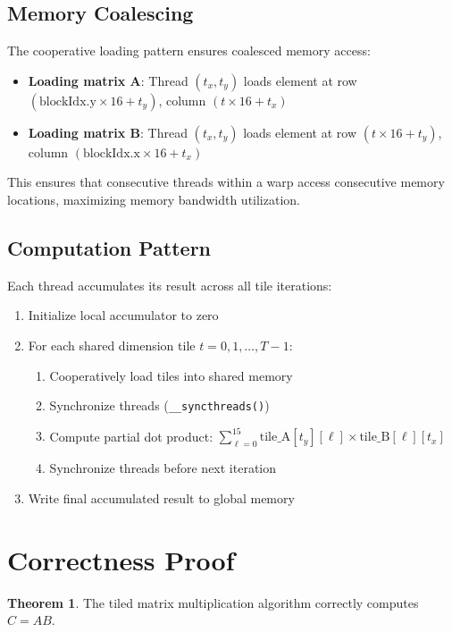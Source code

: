 \documentclass{amsbook}
\theoremstyle{definition}
\newtheorem{theorem}{Theorem}[chapter]
\begin{document}
\subsection{Memory Coalescing}

The cooperative loading pattern ensures coalesced memory access:
\begin{itemize}
\item \textbf{Loading matrix A}: Thread $(t_x, t_y)$ loads element at row $(\text{blockIdx.y} \times 16 + t_y)$, column $(t \times 16 + t_x)$
\item \textbf{Loading matrix B}: Thread $(t_x, t_y)$ loads element at row $(t \times 16 + t_y)$, column $(\text{blockIdx.x} \times 16 + t_x)$
\end{itemize}

This ensures that consecutive threads within a warp access consecutive memory locations, maximizing memory bandwidth utilization.

\subsection{Computation Pattern}

Each thread accumulates its result across all tile iterations:
\begin{enumerate}
\item Initialize local accumulator to zero
\item For each shared dimension tile $t = 0, 1, \ldots, T-1$:
\begin{enumerate}
    \item Cooperatively load tiles into shared memory
    \item Synchronize threads (\texttt{\_\_syncthreads()})
    \item Compute partial dot product: $\sum_{\ell=0}^{15} \text{tile\_A}[t_y][\ell] \times \text{tile\_B}[\ell][t_x]$
    \item Synchronize threads before next iteration
\end{enumerate}
\item Write final accumulated result to global memory
\end{enumerate}

\section{Correctness Proof}

\begin{theorem}
The tiled matrix multiplication algorithm correctly computes $C = AB$.
\end{theorem}
\end{document}

